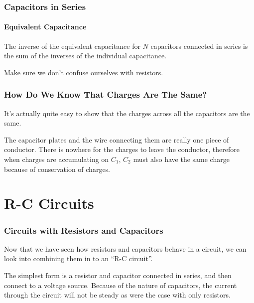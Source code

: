 \documentclass[12pt,aspectratio=169]{beamer}
\newcommand{\eq}[2]{\vspace{#1}{\Large\begin{displaymath}#2\end{displaymath}}}
\begin{document}
\begin{frame}
  \frametitle{Capacitors in Series}
  \framesubtitle{Equivalent Capacitance}
  The inverse of the equivalent capacitance for $N$ capacitors connected in
  series is the sum of the inverses of the individual capacitance.

  \eq{-.2in}{
    \boxed{
      \frac{1}{C_\mathrm{eq}}
      =\frac{1}{C_1}+\frac{1}{C_2}+\cdots+\frac{1}{C_N}
    }
  }
  
  Make sure we don't confuse ourselves with resistors.
\end{frame}

\begin{frame}
  \frametitle{How Do We Know That Charges Are The Same?}
  It's actually quite easy to show that the charges across all the capacitors
  are the same.

  \vspace{-.2in}
  \begin{center}
  \end{center}

  The capacitor plates and the wire connecting them are really one piece of
  conductor. There is nowhere for the charges to leave the conductor, therefore
  when charges are accumulating on $C_1$, $C_2$ must also have the same charge
  because of conservation of charges.
\end{frame}


\section{R-C Circuits}


\begin{frame}
  \frametitle{Circuits with Resistors and Capacitors}
  Now that we have seen how resistors and capacitors behave in a circuit, we
  can look into combining them in to an ``R-C circuit''.

  \vspace{-.2in}
  \begin{center}
  \end{center}

  The simplest form is a resistor and capacitor connected in series, and
  then connect to a voltage source. Because of the nature of capacitors, the
  current through the circuit will not be steady as were the case with only
  resistors.
\end{frame}
\end{document}
